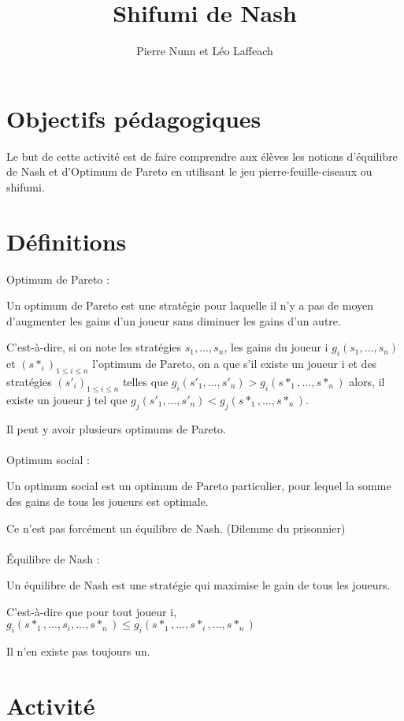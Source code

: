 \documentclass{article}
\title{Shifumi de Nash}
\author{Pierre Nunn et Léo Laffeach}
\begin{document}
\maketitle

\section{Objectifs pédagogiques}

Le but de cette activité est de faire comprendre aux élèves les notions d'équilibre de Nash et d'Optimum de Pareto en utilisant le jeu pierre-feuille-ciseaux ou shifumi.

\section{Définitions}

Optimum de Pareto : 

Un optimum de Pareto est une stratégie pour laquelle il n'y a pas de moyen d'augmenter les gains d'un joueur sans diminuer les gains d'un autre. 

C'est-à-dire, si on note les stratégies $s_1,..., s_n$, les gains du joueur i $g_i(s_1, ..., s_n)$ et $(s*_i)_{1\leq i \leq n}$ l'optimum de Pareto, on a que s'il existe un joueur i et des stratégies $(s'_i)_{1\leq i \leq n}$ telles que $g_i(s'_1, ..., s'_n) > g_i(s*_1, ..., s*_n)$ alors, il existe un joueur j tel que $g_j(s'_1, ..., s'_n) < g_j(s*_1, ..., s*_n)$.

Il peut y avoir plusieurs optimums de Pareto.
\\
\\
Optimum social :

Un optimum social est un optimum de Pareto particulier, pour lequel la somme des gains de tous les joueurs est optimale.

Ce n'est pas forcément un équilibre de Nash. (Dilemme du prisonnier)
\\
\\
Équilibre de Nash : 

Un équilibre de Nash est une stratégie qui maximise le gain de tous les joueurs.

C'est-à-dire que pour tout joueur i, $g_i(s*_1, ..., s_i, ..., s*_n) \leq g_i(s*_1, ..., s*_i, ..., s*_n)$

Il n'en existe pas toujours un.

\section{Activité}
\end{document}
